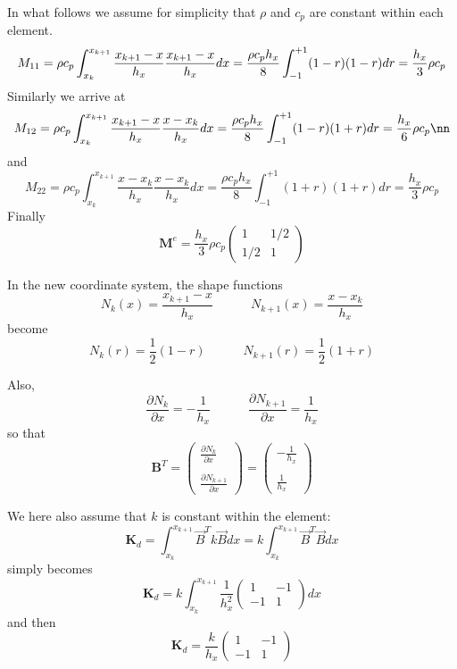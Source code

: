 In what follows we assume for simplicity that $\rho$ and $c_p$ are constant within each element.
\[
M_{11}=
\rho c_p
\int_{\tiny x_k}^{x_{k+1}} 
\frac{x_{k+1}-x}{h_x}  
\frac{x_{k+1}-x}{h_x}  
dx
=  \frac{\rho c_p h_x}{8} \int_{-1}^{+1} (1-r) (1-r)  dr  = \frac{h_x}{3} \rho c_p
\]
Similarly we arrive at 
\begin{eqnarray}
M_{12}
=\rho c_p 
\int_{x_k}^{x_{k+1}} 
\frac{x_{k+1}-x}{h_x}  
\frac{x-x_k}{h_x}  
dx
=
\frac{\rho c_p  h_x}{8} 
\int_{-1}^{+1} (1-r) (1+r)dr
= \frac{h_x}{6} \rho c_p \nn
\end{eqnarray}
and 
\[
M_{22}
=
\rho c_p 
\int_{x_k}^{x_{k+1}} 
\frac{x-x_k}{h_x}  
\frac{x-x_k}{h_x}  
dx
=
\frac{\rho c_p  h_x}{8} 
\int_{-1}^{+1} (1+r) (1+r)dr
= \frac{h_x}{3} \rho c_p 
\]
Finally 
\[
\boxed{
{\bm M}^e= \frac{h_x}{3} \rho c_p  
\left(
\begin{array}{cc}
1  & 1/2 \\
1/2 & 1
\end{array}
\right)
}
\]

In the new coordinate system, the {\color{olive}shape functions} 
\[
N_k(x) = \frac{x_{k+1}-x}{h_x} 
\quad
\quad
\quad
N_{k+1}(x) = \frac{x-x_k}{h_x} 
\]
become 
\[
N_k(r) = \frac{1}{2} (1-r)
\quad
\quad
\quad
N_{k+1}(r) = \frac{1}{2} (1+r)
\]

Also, 
\[
\frac{\partial N_k}{\partial x} = - \frac{1}{h_x} 
\quad
\quad
\quad
\frac{\partial N_{k+1}}{\partial x} = \frac{1}{h_x} 
\]
so that 
\[
{\bm B}^T=
\left(
\begin{array}{cc}
 \frac{\partial N_k}{\partial x}   \\ \\
 \frac{\partial N_{k+1}}{\partial x}
\end{array}
\right)
=
\left(
\begin{array}{cc}
-\frac{1}{h_x} \\ \\
\frac{1}{h_x} 
\end{array}
\right)
\]


We here also assume that $k$ is constant within the element:
\[
{\bm K}_d =
\int_{x_k}^{x_{k+1}}   {\vec B}^T k {\vec B} dx 
= k \int_{x_k}^{x_{k+1}}   {\vec B}^T {\vec B} dx 
\]
simply becomes
\[
{\bm K}_d = k
 \int_{x_k}^{x_{k+1}} 
\frac{1}{h_x^2}
\left(
\begin{array}{cc}
1 & -1 \\ -1 & 1
\end{array}
\right)
dx
\]
and then
\[
\boxed{
{\bm K}_d =
\frac{k}{h_x}
\left(
\begin{array}{cc}
1 & -1 \\ -1 & 1
\end{array}
\right)
}
\]

